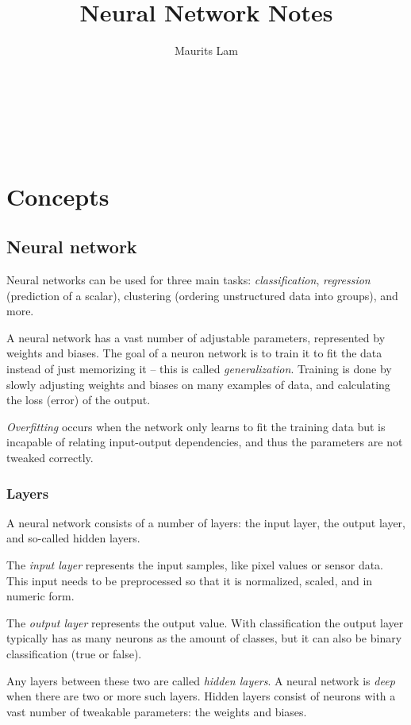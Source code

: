 \documentclass[a4paper]{report}
\title{Neural Network Notes}
\author{Maurits Lam}
\date{}
\makeatletter
\def\maketitle{
    \begin{titlepage}
        \vspace*{0.25\textheight}  %
        \begin{center}
            \Huge \textbf{\@title} \\[1cm]  %
            \Large \textbf{\@author} \\[1cm]  %
            \ifx\@date\empty %
            \else
                \Large \@date \\[2cm]  %
            \fi
        \end{center}
    \end{titlepage}
}
\makeatother
\begin{document}
\maketitle
\tableofcontents  %


\chapter{Concepts}



\section{Neural network}
Neural networks can be used for three main tasks: \emph{classification}, \emph{regression} (prediction of a scalar), clustering (ordering unstructured data into groups), and more.

A neural network has a vast number of adjustable parameters, represented by weights and biases. The goal of a neuron network is to train it to fit the data instead of just memorizing it -- this is called \emph{generalization}. Training is done by slowly adjusting weights and biases on many examples of data, and calculating the loss (error) of the output.

\emph{Overfitting} occurs when the network only learns to fit the training data but is incapable of 
relating input-output dependencies, and thus the parameters are not tweaked correctly.

\subsection*{Layers}
A neural network consists of a number of layers: the input layer, the output layer, and so-called hidden layers.

The \emph{input layer} represents the input samples, like pixel values or sensor data. This input needs to be preprocessed so that it is normalized, scaled, and in numeric form.

The \emph{output layer} represents the output value. With classification the output layer typically has as many neurons as the amount of classes, but it can also be binary classification (true or false).

Any layers between these two are called \emph{hidden layers}. A neural network is \emph{deep} when there are two or more such layers. Hidden layers consist of neurons with a vast number of tweakable parameters: the weights and biases. 
\end{document}

